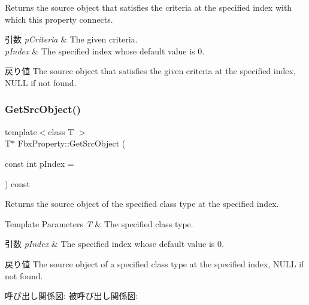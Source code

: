 Returns the source object that satisfies the criteria at the specified index with which this property connects. 
\begin{DoxyParams}{引数}
{\em p\+Criteria} & The given criteria. \\
\hline
{\em p\+Index} & The specified index whose default value is 0. \\
\hline
\end{DoxyParams}
\begin{DoxyReturn}{戻り値}
The source object that satisfies the given criteria at the specified index, N\+U\+LL if not found. 
\end{DoxyReturn}
\mbox{\label{class_fbx_property_a75fae8a9182ea51767ade157d614227a}} 
\subsubsection{\texorpdfstring{Get\+Src\+Object()}{GetSrcObject()}\hspace{0.1cm}{\footnotesize\ttfamily [3/4]}}
{\footnotesize\ttfamily template$<$class T $>$ \\
T$\ast$ Fbx\+Property\+::\+Get\+Src\+Object (\begin{DoxyParamCaption}\item[{const int}]{p\+Index = {} }\end{DoxyParamCaption}) const}

Returns the source object of the specified class type at the specified index. 
\begin{DoxyTemplParams}{Template Parameters}
{\em T} & The specified class type. \\
\hline
\end{DoxyTemplParams}

\begin{DoxyParams}{引数}
{\em p\+Index} & The specified index whose default value is 0. \\
\hline
\end{DoxyParams}
\begin{DoxyReturn}{戻り値}
The source object of a specified class type at the specified index, N\+U\+LL if not found. 
\end{DoxyReturn}
呼び出し関係図\+:
被呼び出し関係図\+:
\mbox{\label{class_fbx_property_ac8ef2f7e7ea3fbfc19ca6202d4b8faf7}} 
